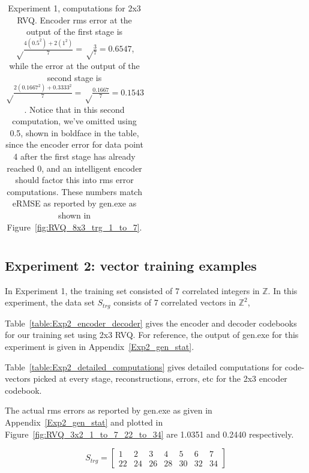 \begin{table}[t]
\begin{tabular}{|l||c|c|c|c|c|c|c|}
\end{tabular}
\caption{Experiment 1, computations for 2x3 RVQ.  Encoder rms error at the output of the first stage is {\color{blue}$\sqrt \frac{4(0.5^2) + 2(1^2)}{7} = \sqrt\frac{3}{7} = 0.6547$}, while the error at the output of the second stage is {\color{darkgreen}$\sqrt \frac{2(0.1667^2) + 0.3333^2}{7} = \sqrt\frac{0.1667}{7} = 0.1543$}.  Notice that in this second computation, we've omitted using 0.5, shown in boldface in the table, since the encoder error for data point 4 after the first stage has already reached 0, and an intelligent encoder should factor this into rms error computations.  These numbers match eRMSE as reported by gen.exe as shown in Figure~\ref{fig:RVQ_8x3_trg_1_to_7}.}
\label{table:Exp1_detailed_computations}
\end{table}


\clearpage
\newpage
\subsection{Experiment 2: vector training examples}
In Experiment 1, the training set consisted of 7 correlated integers in $\mathbb{Z}$.  In this experiment, the data set $S_{trg}$ consists of 7 correlated vectors in $\mathbb{Z}^2$,

Table~\ref{table:Exp2_encoder_decoder} gives the encoder and decoder codebooks for our training set using 2x3 RVQ.  For reference, the output of gen.exe for this experiment is given in Appendix~\ref{Exp2_gen_stat}.

Table~\ref{table:Exp2_detailed_computations} gives detailed computations for code-vectors picked at every stage, reconstructions, errors, etc for the 2x3 encoder codebook.  

The actual rms errors as reported by gen.exe as given in Appendix~\ref{Exp2_gen_stat} and plotted in Figure~\ref{fig:RVQ_3x2_1_to_7_22_to_34} are 1.0351 and 0.2440 respectively.



\begin{equation}
S_{trg} = \left[
\begin{array}{ccccccc}
1 & 2 & 3 & 4 & 5 & 6 & 7\\
22 & 24 & 26 & 28 & 30 & 32 & 34
\end{array}
\right]
\end{equation}


